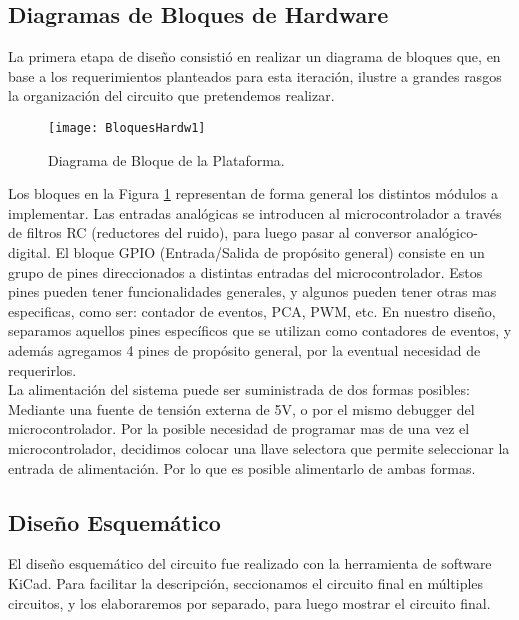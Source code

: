 
\subsection{Diagramas de Bloques de Hardware}
\label{it3:sub:diagrama_de_bloques_de_hardware}

La primera etapa de diseño consistió en realizar un diagrama de bloques que, en base a los requerimientos planteados para esta iteración, ilustre a grandes rasgos la organización del circuito que pretendemos realizar. \\

\begin{figure}[h]
  \centering
  \texttt{[image: BloquesHardw1]}
  \caption{Diagrama de Bloque de la Plataforma.}\label{fig:BloquesHardw1}
\end{figure}

Los bloques en la Figura \ref{fig:BloquesHardw1} representan de forma general los distintos módulos a implementar. Las entradas analógicas se introducen al microcontrolador a través de filtros RC (reductores del ruido), para luego pasar al conversor analógico-digital. El bloque GPIO (Entrada/Salida de propósito general) consiste en un grupo de pines direccionados a distintas entradas del microcontrolador. Estos pines pueden tener funcionalidades generales, y algunos pueden tener otras mas especificas, como ser: contador de eventos, PCA, PWM, etc. En nuestro diseño, separamos aquellos pines específicos que se utilizan como contadores de eventos, y además agregamos 4 pines de propósito general, por la eventual necesidad de requerirlos. \\

La alimentación del sistema puede ser suministrada de dos formas posibles: Mediante una fuente de tensión externa de 5V, o por el mismo debugger del microcontrolador. Por la posible necesidad de programar mas de una vez el microcontrolador, decidimos colocar una llave selectora que permite seleccionar la entrada de alimentación. Por lo que es posible alimentarlo de ambas formas. 


\subsection{Diseño Esquemático}
\label{it3:sub:diseno_esquematico}

El diseño esquemático del circuito fue realizado con la herramienta de software KiCad. Para facilitar la descripción, seccionamos el circuito final en múltiples circuitos, y los elaboraremos por separado, para luego mostrar el circuito final.

